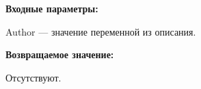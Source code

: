 \textbf{Входные параметры:}

Author --- значение переменной из описания.

\textbf{Возвращаемое значение:}

Отсутствуют.